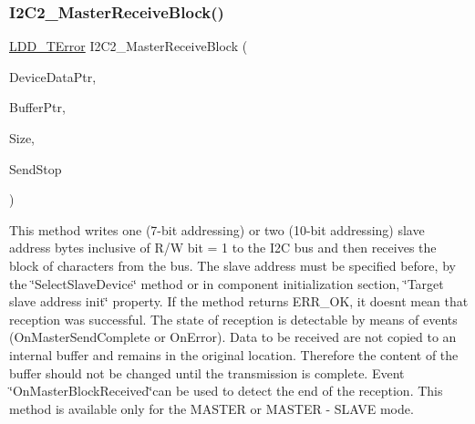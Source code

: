 \subsubsection{\texorpdfstring{I2\+C2\+\_\+\+Master\+Receive\+Block()}{I2C2\_MasterReceiveBlock()}}
{\footnotesize\ttfamily \hyperlink{group___p_e___types__module_ga24c2b045fd04e79e85f261ce4df35588}{L\+D\+D\+\_\+\+T\+Error} I2\+C2\+\_\+\+Master\+Receive\+Block (\begin{DoxyParamCaption}\item[{\hyperlink{group___p_e___types__module_gac5cf1362f1f0e3a2ce71b1bf2276d091}{L\+D\+D\+\_\+\+T\+Device\+Data} $\ast$}]{Device\+Data\+Ptr,  }\item[{\hyperlink{group___p_e___types__module_gade8ef9401405bd941b6da738b807f980}{L\+D\+D\+\_\+\+T\+Data} $\ast$}]{Buffer\+Ptr,  }\item[{\hyperlink{group___p_e___types__module_gaa7fd2bc3f1f93e051058f9e70349c2b9}{L\+D\+D\+\_\+\+I2\+C\+\_\+\+T\+Size}}]{Size,  }\item[{\hyperlink{group___p_e___types__module_gacac4ade6fbcd28c9ddcd864242063ec8}{L\+D\+D\+\_\+\+I2\+C\+\_\+\+T\+Send\+Stop}}]{Send\+Stop }\end{DoxyParamCaption})}



This method writes one (7-\/bit addressing) or two (10-\/bit addressing) slave address bytes inclusive of R/W bit = 1 to the I2C bus and then receives the block of characters from the bus. The slave address must be specified before, by the \char`\"{}\+Select\+Slave\+Device\char`\"{} method or in component initialization section, \char`\"{}\+Target slave address init\char`\"{} property. If the method returns E\+R\+R\+\_\+\+OK, it doesn\textquotesingle{}t mean that reception was successful. The state of reception is detectable by means of events (On\+Master\+Send\+Complete or On\+Error). Data to be received are not copied to an internal buffer and remains in the original location. Therefore the content of the buffer should not be changed until the transmission is complete. Event \char`\"{}\+On\+Master\+Block\+Received\char`\"{}can be used to detect the end of the reception. This method is available only for the M\+A\+S\+T\+ER or M\+A\+S\+T\+ER -\/ S\+L\+A\+VE mode. 


